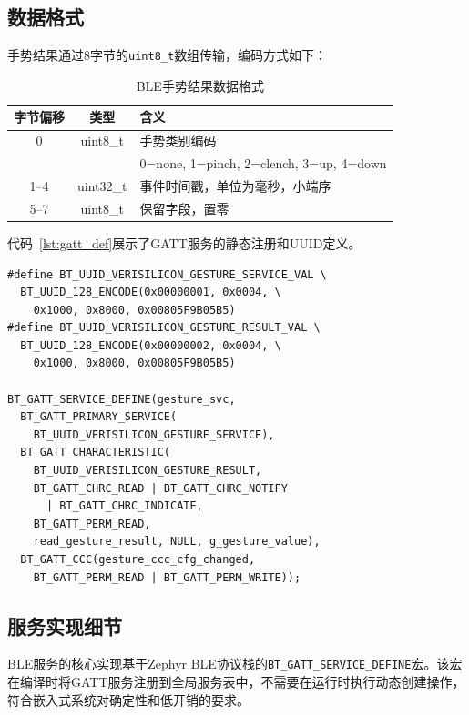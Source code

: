 \documentclass[lettersize,journal]{IEEEtran}
\begin{document}
\subsection{数据格式}

手势结果通过8字节的\texttt{uint8\_t}数组传输，编码方式如下：

\begin{table}[htbp]
    \centering
    \caption{BLE手势结果数据格式}
    \label{tab:ble_data_format}
    \begin{tabular}{ccp{4cm}}
        \toprule
        \textbf{字节偏移} & \textbf{类型} & \textbf{含义} \\
        \midrule
        0     & uint8\_t  & 手势类别编码\\
              &           & 0=none, 1=pinch, 2=clench, 3=up, 4=down \\
        1--4  & uint32\_t & 事件时间戳，单位为毫秒，小端序 \\
        5--7  & uint8\_t  & 保留字段，置零 \\
        \bottomrule
    \end{tabular}
\end{table}

代码~\ref{lst:gatt_def}展示了GATT服务的静态注册和UUID定义。

\begin{lstlisting}[caption={BLE GATT服务静态注册（gesture\_ble\_service.c）},label={lst:gatt_def}]
#define BT_UUID_VERISILICON_GESTURE_SERVICE_VAL \
  BT_UUID_128_ENCODE(0x00000001, 0x0004, \
    0x1000, 0x8000, 0x00805F9B05B5)
#define BT_UUID_VERISILICON_GESTURE_RESULT_VAL \
  BT_UUID_128_ENCODE(0x00000002, 0x0004, \
    0x1000, 0x8000, 0x00805F9B05B5)

BT_GATT_SERVICE_DEFINE(gesture_svc,
  BT_GATT_PRIMARY_SERVICE(
    BT_UUID_VERISILICON_GESTURE_SERVICE),
  BT_GATT_CHARACTERISTIC(
    BT_UUID_VERISILICON_GESTURE_RESULT,
    BT_GATT_CHRC_READ | BT_GATT_CHRC_NOTIFY
      | BT_GATT_CHRC_INDICATE,
    BT_GATT_PERM_READ,
    read_gesture_result, NULL, g_gesture_value),
  BT_GATT_CCC(gesture_ccc_cfg_changed,
    BT_GATT_PERM_READ | BT_GATT_PERM_WRITE));
\end{lstlisting}

\subsection{服务实现细节}

BLE服务的核心实现基于Zephyr BLE协议栈的\texttt{BT\_GATT\_SERVICE\_DEFINE}宏。该宏在编译时将GATT服务注册到全局服务表中，不需要在运行时执行动态创建操作，符合嵌入式系统对确定性和低开销的要求。
\end{document}
